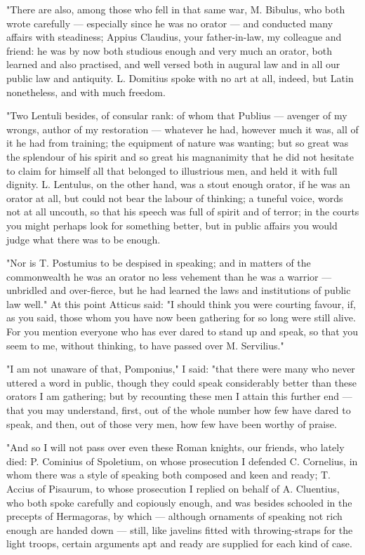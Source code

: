  "There are also, among those who fell in that same war, M. Bibulus, who both wrote carefully — especially since he was no orator — and conducted many affairs with steadiness; Appius Claudius, your father-in-law, my colleague and friend: he was by now both studious enough and very much an orator, both learned and also practised, and well versed both in augural law and in all our public law and antiquity. L. Domitius spoke with no art at all, indeed, but Latin nonetheless, and with much freedom.

 "Two Lentuli besides, of consular rank: of whom that Publius — avenger of my wrongs, author of my restoration — whatever he had, however much it was, all of it he had from training; the equipment of nature was wanting; but so great was the splendour of his spirit and so great his magnanimity that he did not hesitate to claim for himself all that belonged to illustrious men, and held it with full dignity. L. Lentulus, on the other hand, was a stout enough orator, if he was an orator at all, but could not bear the labour of thinking; a tuneful voice, words not at all uncouth, so that his speech was full of spirit and of terror; in the courts you might perhaps look for something better, but in public affairs you would judge what there was to be enough.

 "Nor is T. Postumius to be despised in speaking; and in matters of the commonwealth he was an orator no less vehement than he was a warrior — unbridled and over-fierce, but he had learned the laws and institutions of public law well." At this point Atticus said: "I should think you were courting favour, if, as you said, those whom you have now been gathering for so long were still alive. For you mention everyone who has ever dared to stand up and speak, so that you seem to me, without thinking, to have passed over M. Servilius."

 "I am not unaware of that, Pomponius," I said: "that there were many who never uttered a word in public, though they could speak considerably better than these orators I am gathering; but by recounting these men I attain this further end — that you may understand, first, out of the whole number how few have dared to speak, and then, out of those very men, how few have been worthy of praise.

 "And so I will not pass over even these Roman knights, our friends, who lately died: P. Cominius of Spoletium, on whose prosecution I defended C. Cornelius, in whom there was a style of speaking both composed and keen and ready; T. Accius of Pisaurum, to whose prosecution I replied on behalf of A. Cluentius, who both spoke carefully and copiously enough, and was besides schooled in the precepts of Hermagoras, by which — although ornaments of speaking not rich enough are handed down — still, like javelins fitted with throwing-straps for the light troops, certain arguments apt and ready are supplied for each kind of case.

